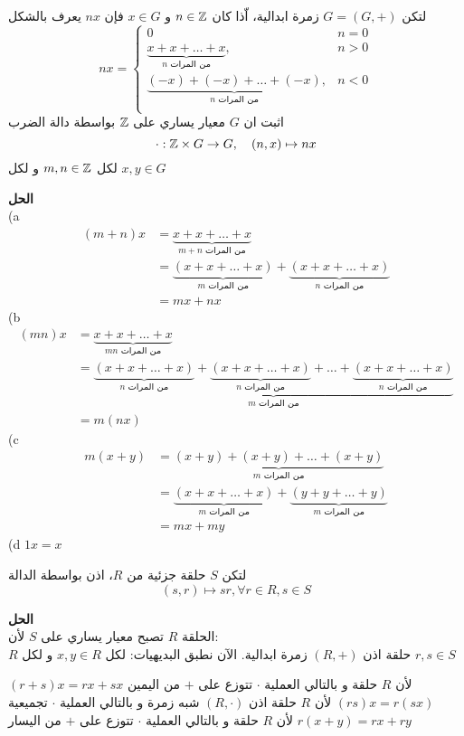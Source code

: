 \begin{example}\label{ex:modules}
	لتكن $G=(G, +)$ زمرة ابدالية، اّذا كان $n\in\mathbb{Z}$ و $x\in G$ فإن $nx$ يعرف بالشكل 
\[
nx = 
\begin{cases}
	0 & n=0 \\
	\underbrace{x+x+\dots+x}_{\text{$n$ من المرات}}, & n>0\\
	\underbrace{(-x)+(-x)+\dots+(-x)}_{\text{$n$ من المرات}}, & n<0\\
\end{cases}
\]
	اثبت ان $G$ معيار يساري على $\mathbb{Z}$ بواسطة دالة الضرب
	\[
	\cdot : \mathbb{Z}\times G \to G, \quad (n,x) \mapsto nx
	\]
	لكل $m,n\in \mathbb{Z}$ و لكل $x,y\in G$
\end{example}
\newpage
\noindent
	\textbf{الحل}\\
	\noindent
	(a
	\begin{align*}
		(m+n) x &= \underbrace{x+x+\dots+x}_{\text{$m+n$ من المرات}}\\
		&= \underbrace{(x+x+\dots+x)}_{\text{$m$ من المرات}} +  \underbrace{(x+x+\dots+x)}_{\text{$n$ من المرات}} \\
		&= mx+nx
	\end{align*}
	(b
	\begin{align*}
		(mn)x &= \underbrace{x+x+\dots+x}_{\text{$mn$ من المرات}}\\
		&= \underbrace{
		\underbrace{(x+x+\dots+x)}_{\text{$n$ من المرات}} + \underbrace{(x+x+\dots+x)}_{\text{$n$ من المرات}} + \dots + \underbrace{(x+x+\dots+x)}_{\text{$n$ من المرات}}
		}_{\text{$m$ من المرات}}\\
		&= m(nx)
	\end{align*}
	(c
	\begin{align*}
		m(x+y) &= \underbrace{(x+y)+(x+y)+\dots+(x+y)}_{\text{$m$ من المرات}}\\
		&= \underbrace{(x+x+\dots+x)}_{\text{$m$ من المرات}} + \underbrace{(y+y+\dots+y)}_{\text{$m$ من المرات}} \\
		&= mx+ my
	\end{align*}
	(d $1x = x$
	\begin{example}
		لتكن $S$ حلقة جزئية من $R$، اذن بواسطة الدالة
		\[
		(s,r) \mapsto sr, \forall r\in R , s\in S
		\]
	\end{example}
	\noindent
	\textbf{الحل}\\
	\noindent
	الحلقة $R$ تصبح معيار يساري على $S$ لأن:\\
	 	$R$ حلقة اذن $(R,+)$ زمرة ابدالية. الآن نطبق البديهيات: لكل $x,y\in R$ و لكل $r,s\in S$
	\begin{tasks}
			\task $(r+s)x=rx+sx$ لأن $R$ حلقة و بالتالي العملية $\cdot$ تتوزع على $+$ من اليمين
		\task $(rs)x=r(sx)$ لأن $R$ حلقة اذن $(R,\cdot)$ شبه زمرة و بالتالي العملية $\cdot$ تجميعية
		\task $r(x+y) = rx+ry$ لأن $R$ حلقة و بالتالي العملية $\cdot$ تتوزع على $+$ من اليسار
	\end{tasks}

